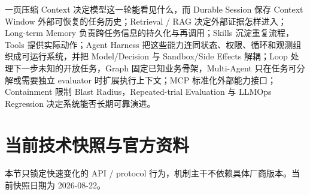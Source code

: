 \documentclass[profile=standard,twoside=false]{ipara-handbook}
\begin{document}
\begin{mentalmodel}{一页压缩}
Context 决定模型这一轮能看见什么，而 Durable Session 保存 Context Window 外部可恢复的任务历史；Retrieval / RAG 决定外部证据怎样进入；Long-term Memory 负责跨任务信息的持久化与再调用；Skills 沉淀重复流程，Tools 提供实际动作；Agent Harness 把这些能力连同状态、权限、循环和观测组织成可运行系统，并把 Model/Decision 与 Sandbox/Side Effects 解耦；Loop 处理下一步未知的开放任务，Graph 固定已知业务骨架，Multi-Agent 只在任务可分解或需要独立 evaluator 时扩展执行上下文；MCP 标准化外部能力接口；Containment 限制 Blast Radius，Repeated-trial Evaluation 与 LLMOps Regression 决定系统能否长期可靠演进。
\end{mentalmodel}

\section{当前技术快照与官方资料}

本节只锁定快速变化的 API / protocol 行为，机制主干不依赖具体厂商版本。当前快照日期为 2026-08-22。
\end{document}
